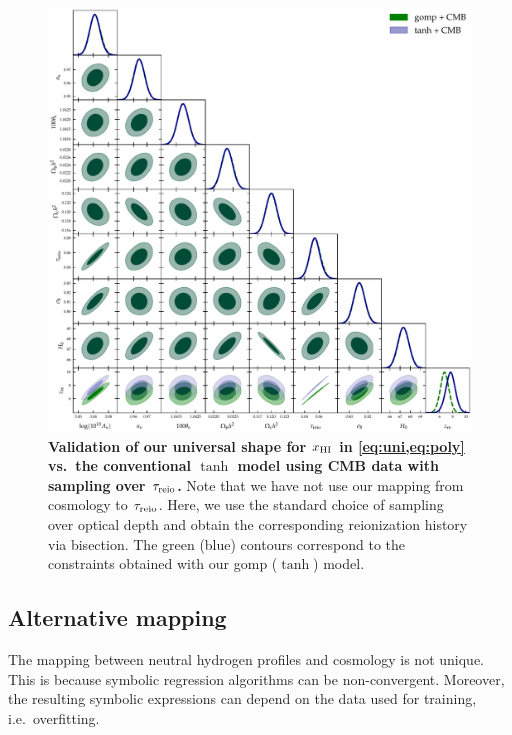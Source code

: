 \begin{figure}[t]
\centering
\includegraphics[width=\linewidth]{figs/gomp_tanh_triangle_tau.pdf}
\caption{\textbf{Validation of our universal shape for $x_{\mathrm{HI}}$ in \cref{eq:uni,eq:poly} vs.\ the
conventional $\tanh$ model using CMB data with sampling over $\tau_{\mathrm{reio}}$.}
Note that we have not use our mapping from cosmology to $\tau_{\mathrm{reio}}$. 
Here, we use the standard choice of sampling
over optical depth and obtain the corresponding reionization history via bisection.
The green (blue) contours correspond to the constraints obtained with
our gomp ($\tanh$) model.}
\label{fig:tg}
\end{figure}


\subsection*{Alternative mapping}
\label{ssec:SRHalf}

The mapping between neutral hydrogen profiles and cosmology is not
unique.
This is because symbolic regression algorithms can be non-convergent.
Moreover, the resulting symbolic expressions can depend on the data used
for training, i.e.\ overfitting.

